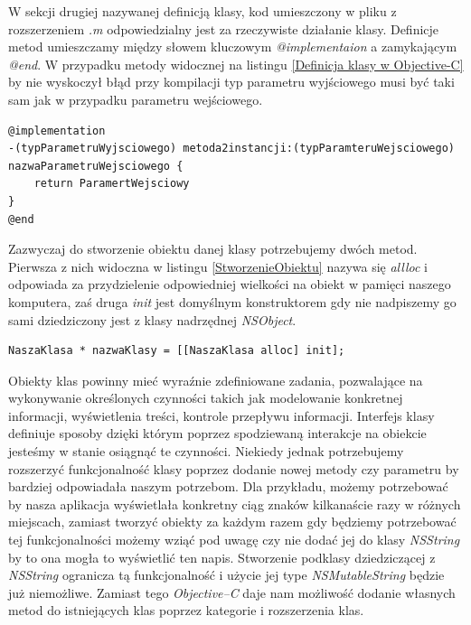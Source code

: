 \documentclass{iiuwb}
\begin{document}
W sekcji drugiej nazywanej definicją klasy, kod umieszczony w pliku z rozszerzeniem \textit{.m} odpowiedzialny jest za rzeczywiste działanie klasy. Definicje metod umieszczamy między słowem kluczowym \textit{@implementaion} a zamykającym \textit{@end}. W przypadku metody widocznej na listingu \ref{Definicja klasy w Objective-C} by nie wyskoczył błąd przy kompilacji typ parametru wyjściowego musi być taki sam jak w przypadku parametru wejściowego.
\begin{lstlisting}[label=Definicja klasy w Objective-C, caption=Definicje klasy umieszczamy w pliku \textit{.m}]
@implementation
-(typParametruWyjsciowego) metoda2instancji:(typParamteruWejsciowego) nazwaParametruWejsciowego {
	return ParamertWejsciowy
}
@end
\end{lstlisting}

Zazwyczaj do stworzenie obiektu danej klasy potrzebujemy dwóch metod. Pierwsza z nich widoczna w listingu \ref{StworzenieObiektu} nazywa się \textit{allloc} i odpowiada za przydzielenie odpowiedniej wielkości na obiekt w pamięci naszego komputera, zaś druga \textit{init} jest domyślnym konstruktorem gdy nie nadpiszemy go sami dziedziczony jest z klasy nadrzędnej \textit{NSObject}.
\begin{lstlisting}[label=StworzenieObiektu, caption=Instrukcja stworzenia obiektu.]
NaszaKlasa * nazwaKlasy = [[NaszaKlasa alloc] init];
\end{lstlisting}

Obiekty klas powinny mieć wyraźnie zdefiniowane zadania, pozwalające na  wykonywanie określonych czynności takich jak modelowanie konkretnej informacji, wyświetlenia treści, kontrole przepływu informacji. Interfejs klasy definiuje sposoby dzięki którym poprzez spodziewaną interakcje na obiekcie jesteśmy w stanie osiągnąć te czynności. Niekiedy jednak potrzebujemy rozszerzyć funkcjonalność klasy poprzez dodanie nowej metody czy parametru by bardziej odpowiadała naszym potrzebom. Dla przykładu, możemy potrzebować by nasza aplikacja wyświetlała konkretny ciąg znaków kilkanaście razy w różnych miejscach, zamiast tworzyć obiekty za każdym razem gdy będziemy potrzebować tej funkcjonalności możemy wziąć pod uwagę czy nie dodać jej do klasy \textit{NSString} by to ona mogła to wyświetlić ten napis. Stworzenie podklasy dziedziczącej z \textit{NSString} ogranicza tą funkcjonalność i użycie jej type \textit{NSMutableString} będzie już niemożliwe. Zamiast tego \textit{Objective--C} daje nam możliwość dodanie własnych metod do istniejących klas poprzez kategorie i rozszerzenia klas. 
\end{document}
